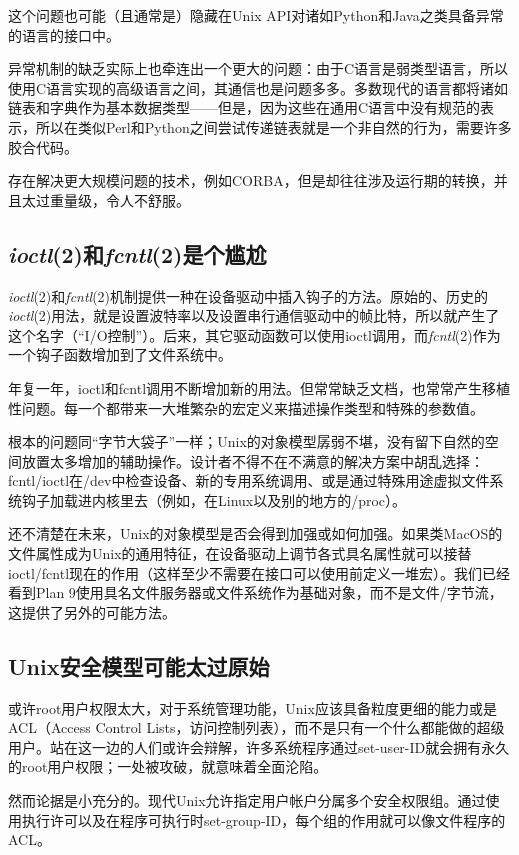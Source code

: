 \documentclass[12pt,oneside]{book}
\begin{document}
这个问题也可能（且通常是）隐藏在Unix API对诸如Python和Java之类具备异常的语言的接口中。

异常机制的缺乏实际上也牵连出一个更大的问题：由于C语言是弱类型语言，所以使用C语言实现的高级语言之间，其通信也是问题多多。多数现代的语言都将诸如链表和字典作为基本数据类型——但是，因为这些在通用C语言中没有规范的表示，所以在类似Perl和Python之间尝试传递链表就是一个非自然的行为，需要许多胶合代码。

存在解决更大规模问题的技术，例如CORBA，但是却往往涉及运行期的转换，并且太过重量级，令人不舒服。

\subsection{\textit{ioctl}(2)和\textit{fcntl}(2)是个尴尬}
\textit{ioctl}(2)和\textit{fcntl}(2)机制提供一种在设备驱动中插入钩子的方法。原始的、历史的\textit{ioctl}(2)用法，就是设置波特率以及设置串行通信驱动中的帧比特，所以就产生了这个名字（“I/O控制”）。后来，其它驱动函数可以使用ioctl调用，而\textit{fcntl}(2)作为一个钩子函数增加到了文件系统中。

年复一年，ioctl和fcntl调用不断增加新的用法。但常常缺乏文档，也常常产生移植性问题。每一个都带来一大堆繁杂的宏定义来描述操作类型和特殊的参数值。

根本的问题同“字节大袋子”一样；Unix的对象模型孱弱不堪，没有留下自然的空间放置太多增加的辅助操作。设计者不得不在不满意的解决方案中胡乱选择：fcntl/ioctl在/dev中检查设备、新的专用系统调用、或是通过特殊用途虚拟文件系统钩子加载进内核里去（例如，在Linux以及别的地方的/proc）。

还不清楚在未来，Unix的对象模型是否会得到加强或如何加强。如果类MacOS的文件属性成为Unix的通用特征，在设备驱动上调节各式具名属性就可以接替ioctl/fcntl现在的作用（这样至少不需要在接口可以使用前定义一堆宏）。我们已经看到Plan 9使用具名文件服务器或文件系统作为基础对象，而不是文件/字节流，这提供了另外的可能方法。

\subsection{Unix安全模型可能太过原始}
或许root用户权限太大，对于系统管理功能，Unix应该具备粒度更细的能力或是ACL（Access Control Lists，访问控制列表），而不是只有一个什么都能做的超级用户。站在这一边的人们或许会辩解，许多系统程序通过set-user-ID就会拥有永久的root用户权限；一处被攻破，就意味着全面沦陷。

然而论据是小充分的。现代Unix允许指定用户帐户分属多个安全权限组。通过使用执行许可以及在程序可执行时set-group-ID，每个组的作用就可以像文件程序的ACL。
\end{document}
